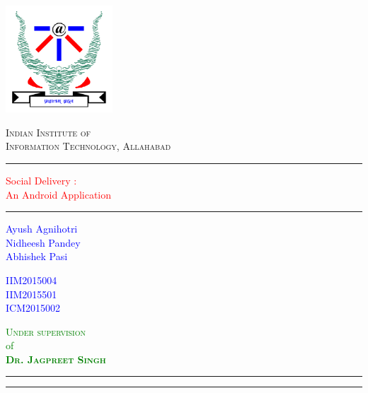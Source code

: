 \documentclass{report}
\begin{document}
 

\begin{titlepage}
	\centering
	\includegraphics[width=4cm]{logo.png}\\[.5cm]
	{\scshape\LARGE Indian Institute of \\Information Technology, Allahabad \par}
	\vspace{1cm}
	\rule{\textwidth}{2pt}	
	\vspace{0.1\textheight}
		
	\textcolor{Red}{ 
		{\fontsize{35}{42}\selectfont Social Delivery : \\ An Android Application}\\[0.5\baselineskip]
	}
	
	\vspace{0.185\textheight} 
	
	\rule{0.3\textwidth}{0.4pt} 
	\begin{multicols}{3} 
	\textcolor{Blue}{
		\begin{flushleft} 
		{\large Ayush Agnihotri}\\[5pt] 
		{\large Nidheesh Pandey}\\[5pt]
		{\large Abhishek Pasi}\\[5pt]
		\end{flushleft}
		}
		\columnbreak
		 
	\textcolor{Blue}{
		\begin{flushleft} 
		{\large IIM2015004}\\[5pt] 
		{\large IIM2015501}\\[5pt]
		{\large ICM2015002}\\[5pt]
		\end{flushleft}
		}
		\columnbreak

	\textcolor{Green}{
		\begin{flushright}
		{\Large \textsc{Under supervision}}\\
		{\large of}\\
		{\Large \textsc{\textbf{Dr. Jagpreet Singh}}}
		\end{flushright}
		}
	\end{multicols}
	\vspace{0.065\textheight} 
	
\hfill


	\rule{\textwidth}{0.4pt} %
	
	\vspace{2pt}\vspace{-\baselineskip} %
	
	\rule{\textwidth}{2pt} %
	
\end{titlepage}
\end{document}
